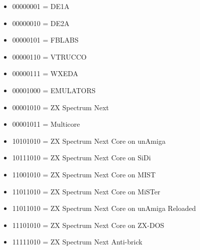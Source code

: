 \begin{itemize}
\item 00000001 = DE1A
\item 00000010 = DE2A
\item 00000101 = FBLABS
\item 00000110 = VTRUCCO
\item 00000111 = WXEDA
\item 00001000 = EMULATORS
\item 00001010 = ZX Spectrum Next
\item 00001011 = Multicore
\item 10101010 = ZX Spectrum Next Core on unAmiga
\item 10111010 = ZX Spectrum Next Core on SiDi
\item 11001010 = ZX Spectrum Next Core on MIST
\item 11011010 = ZX Spectrum Next Core on MiSTer
\item 11011010 = ZX Spectrum Next Core on unAmiga Reloaded
\item 11101010 = ZX Spectrum Next Core on ZX-DOS
\item 11111010 = ZX Spectrum Next Anti-brick
\end{itemize}

